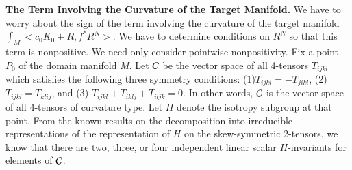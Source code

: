 {\bf The Term Involving the Curvature of the Target Manifold.} We have to worry about the sign of the term involving the curvature of the target manifold $\int_{M} < c_{0}K_{0} + R, f^{*}R^{N}>$. We have to determine conditions on $R^{N}$ so that this term is nonpositive. We need only consider pointwise nonpositivity. Fix a point $P_{0}$ of the domain manifold $M$. Let $\mathcal{C}$ be  the vector space of all 4-tensors $T_{ijkl}$ which satisfies the following three symmetry conditions:
(1)$T_{ijkl}= -T_{jikl}$, (2) $T_{ijkl}= T_{klij}$, and (3) $T_{ijkl} + T_{iklj} + T_{iljk} =0$. In other words, $\mathcal{C}$ is the vector space of all 4-tensors of curvature type. Let $H$ denote the isotropy subgroup at that point. From the known results on the decomposition into irreducible representations of the representation of $H$ on the skew-symmetric 2-tensors, we know that there are two, three, or four independent linear scalar $H$-invariants for elements of $\mathcal{C}$.

